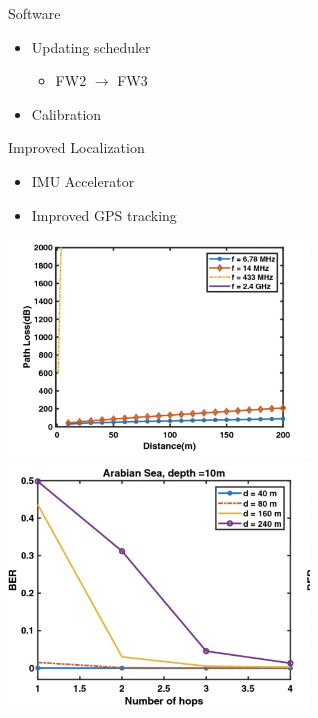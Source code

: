 \begin{frame}{Software}
    \begin{itemize}
        \item Updating scheduler
        \begin{itemize} 
            \item FW2 $\rightarrow$ FW3
        \end{itemize}
        \item Calibration
    \end{itemize}    
\end{frame}

\begin{frame}{Improved Localization }
    \begin{itemize}
        \item IMU Accelerator
        \item Improved GPS tracking
    \end{itemize}   
    \includegraphics[height=0.6\textheight, width=0.6\textwidth, keepaspectratio]{images/path-loss.png}
    \includegraphics[height=0.6\textheight, width=0.6\textwidth, keepaspectratio]{images/multihop-biterror.png}
\end{frame}


